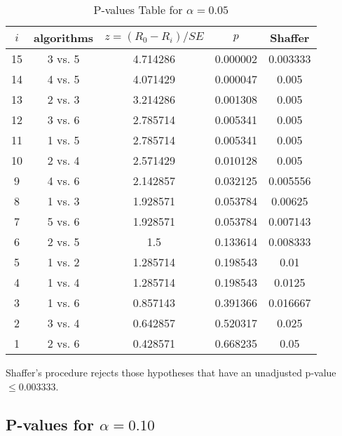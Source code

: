 \documentclass[a4paper,10pt]{article}
\begin{document}
\begin{landscape}
\begin{table}[!htp]
\centering\scriptsize
\begin{tabular}{ccccc}
$i$&algorithms&$z=(R_0 - R_i)/SE$&$p$&Shaffer\\
\hline15&3 vs. 5&4.714286&0.000002&0.003333\\
14&4 vs. 5&4.071429&0.000047&0.005\\
13&2 vs. 3&3.214286&0.001308&0.005\\
12&3 vs. 6&2.785714&0.005341&0.005\\
11&1 vs. 5&2.785714&0.005341&0.005\\
10&2 vs. 4&2.571429&0.010128&0.005\\
9&4 vs. 6&2.142857&0.032125&0.005556\\
8&1 vs. 3&1.928571&0.053784&0.00625\\
7&5 vs. 6&1.928571&0.053784&0.007143\\
6&2 vs. 5&1.5&0.133614&0.008333\\
5&1 vs. 2&1.285714&0.198543&0.01\\
4&1 vs. 4&1.285714&0.198543&0.0125\\
3&1 vs. 6&0.857143&0.391366&0.016667\\
2&3 vs. 4&0.642857&0.520317&0.025\\
1&2 vs. 6&0.428571&0.668235&0.05\\
\hline
\end{tabular}
\caption{P-values Table for $\alpha=0.05$}
\end{table}Shaffer's procedure rejects those hypotheses that have an unadjusted p-value $\le0.003333$.

\pagebreak

\subsection{P-values for $\alpha=0.10$}


\end{landscape}
\end{document}
